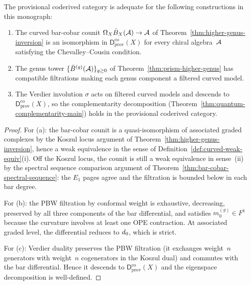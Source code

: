 \begin{proposition}
\label{prop:coderived-adequacy}
The provisional coderived category is adequate for the following
constructions in this monograph:
\begin{enumerate}[label=\textup{(\alph*)}]
\item The curved bar-cobar counit
  $\Omega_X \bar{B}_X(\mathcal{A}) \to \mathcal{A}$ of
  Theorem~\textup{\ref{thm:higher-genus-inversion}} is an isomorphism
  in $\mathsf{D}^{\mathrm{co}}_{\mathrm{prov}}(X)$ for every chiral
  algebra~$\mathcal{A}$ satisfying the Chevalley--Cousin condition.
\item The genus tower $\{\bar{B}^{(g)}(\mathcal{A})\}_{g \geq 0}$ of
  Theorem~\textup{\ref{thm:prism-higher-genus}} has compatible
  filtrations making each genus component a filtered curved model.
\item The Verdier involution $\sigma$ acts on filtered curved models
  and descends to $\mathsf{D}^{\mathrm{co}}_{\mathrm{prov}}(X)$,
  so the complementarity decomposition
  \textup{(}Theorem~\textup{\ref{thm:quantum-complementarity-main})}
  holds in the provisional coderived category.
\end{enumerate}
\end{proposition}

\begin{proof}
For (a): the bar-cobar counit is a quasi-isomorphism of associated
graded complexes by the Koszul locus argument of
Theorem~\ref{thm:higher-genus-inversion}, hence a weak equivalence
in the sense of Definition~\ref{def:curved-weak-equiv}(i).
Off the Koszul locus, the counit is still a weak equivalence
in sense~(ii) by the spectral sequence comparison argument of
Theorem~\ref{thm:bar-cobar-spectral-sequence}: the $E_1$ pages agree
and the filtration is bounded below in each bar degree.

For (b): the PBW filtration by conformal weight is exhaustive,
decreasing, preserved by all three components of the bar differential,
and satisfies $m_0^{(g)} \in F^1$ because the curvature involves at
least one OPE contraction.  At associated graded level, the
differential reduces to $d_0$, which is strict.

For (c): Verdier duality preserves the PBW filtration
(it exchanges weight~$n$ generators with weight~$n$ cogenerators in
the Koszul dual) and commutes with the bar differential.  Hence it
descends to $\mathsf{D}^{\mathrm{co}}_{\mathrm{prov}}(X)$ and the
eigenspace decomposition is well-defined.
\end{proof}

